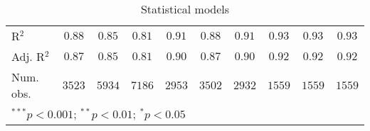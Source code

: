 \begin{table}
\begin{center}
\begin{tabular}{l c c c c c c c c c}
R$^2$                                                  & $0.88$       & $0.85$       & $0.81$   & $0.91$       & $0.88$        & $0.91$       & $0.93$        & $0.93$        & $0.93$        \\
Adj. R$^2$                                             & $0.87$       & $0.85$       & $0.81$   & $0.90$       & $0.87$        & $0.90$       & $0.92$        & $0.92$        & $0.92$        \\
Num. obs.                                              & $3523$       & $5934$       & $7186$   & $2953$       & $3502$        & $2932$       & $1559$        & $1559$        & $1559$        \\
\hline
\multicolumn{10}{l}{\scriptsize{$^{***}p<0.001$; $^{**}p<0.01$; $^{*}p<0.05$}}
\end{tabular}
\caption{Statistical models}
\label{table:coefficients}
\end{center}
\end{table}
